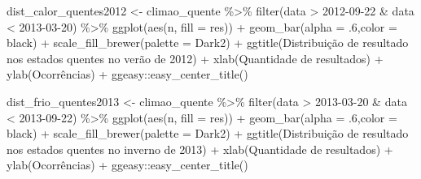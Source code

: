 \documentclass[
]{article}
\newenvironment{Shaded}{\begin{snugshade}}{\end{snugshade}}
\newcommand{\AttributeTok}[1]{\textcolor[rgb]{0.77,0.63,0.00}{#1}}
\newcommand{\DecValTok}[1]{\textcolor[rgb]{0.00,0.00,0.81}{#1}}
\newcommand{\FunctionTok}[1]{\textcolor[rgb]{0.00,0.00,0.00}{#1}}
\newcommand{\NormalTok}[1]{#1}
\newcommand{\OtherTok}[1]{\textcolor[rgb]{0.56,0.35,0.01}{#1}}
\newcommand{\SpecialCharTok}[1]{\textcolor[rgb]{0.00,0.00,0.00}{#1}}
\newcommand{\StringTok}[1]{\textcolor[rgb]{0.31,0.60,0.02}{#1}}
\begin{document}
\begin{Shaded}
\begin{Highlighting}[]
\NormalTok{dist\_calor\_quentes2012 }\OtherTok{\textless{}{-}}\NormalTok{ climao\_quente }\SpecialCharTok{\%\textgreater{}\%} 
  \FunctionTok{filter}\NormalTok{(data }\SpecialCharTok{\textgreater{}} \StringTok{\textquotesingle{}2012{-}09{-}22\textquotesingle{}} \SpecialCharTok{\&}\NormalTok{ data }\SpecialCharTok{\textless{}} \StringTok{\textquotesingle{}2013{-}03{-}20\textquotesingle{}}\NormalTok{) }\SpecialCharTok{\%\textgreater{}\%}
  \FunctionTok{ggplot}\NormalTok{(}\FunctionTok{aes}\NormalTok{(n, }\AttributeTok{fill =}\NormalTok{ res)) }\SpecialCharTok{+} 
  \FunctionTok{geom\_bar}\NormalTok{(}\AttributeTok{alpha =}\NormalTok{ .}\DecValTok{6}\NormalTok{,}\AttributeTok{color =} \StringTok{\textquotesingle{}black\textquotesingle{}}\NormalTok{) }\SpecialCharTok{+} 
  \FunctionTok{scale\_fill\_brewer}\NormalTok{(}\AttributeTok{palette =} \StringTok{\textquotesingle{}Dark2\textquotesingle{}}\NormalTok{) }\SpecialCharTok{+}
  \FunctionTok{ggtitle}\NormalTok{(}\StringTok{\textquotesingle{}Distribuição de resultado nos estados quentes no verão de 2012\textquotesingle{}}\NormalTok{) }\SpecialCharTok{+}
  \FunctionTok{xlab}\NormalTok{(}\StringTok{\textquotesingle{}Quantidade de resultados\textquotesingle{}}\NormalTok{) }\SpecialCharTok{+} \FunctionTok{ylab}\NormalTok{(}\StringTok{\textquotesingle{}Ocorrências\textquotesingle{}}\NormalTok{) }\SpecialCharTok{+}
\NormalTok{  ggeasy}\SpecialCharTok{::}\FunctionTok{easy\_center\_title}\NormalTok{()}


\NormalTok{dist\_frio\_quentes2013 }\OtherTok{\textless{}{-}}\NormalTok{ climao\_quente }\SpecialCharTok{\%\textgreater{}\%} 
  \FunctionTok{filter}\NormalTok{(data }\SpecialCharTok{\textgreater{}} \StringTok{\textquotesingle{}2013{-}03{-}20\textquotesingle{}} \SpecialCharTok{\&}\NormalTok{ data }\SpecialCharTok{\textless{}} \StringTok{\textquotesingle{}2013{-}09{-}22\textquotesingle{}}\NormalTok{) }\SpecialCharTok{\%\textgreater{}\%}
  \FunctionTok{ggplot}\NormalTok{(}\FunctionTok{aes}\NormalTok{(n, }\AttributeTok{fill =}\NormalTok{ res)) }\SpecialCharTok{+} 
  \FunctionTok{geom\_bar}\NormalTok{(}\AttributeTok{alpha =}\NormalTok{ .}\DecValTok{6}\NormalTok{,}\AttributeTok{color =} \StringTok{\textquotesingle{}black\textquotesingle{}}\NormalTok{) }\SpecialCharTok{+} 
  \FunctionTok{scale\_fill\_brewer}\NormalTok{(}\AttributeTok{palette =} \StringTok{\textquotesingle{}Dark2\textquotesingle{}}\NormalTok{) }\SpecialCharTok{+}
  \FunctionTok{ggtitle}\NormalTok{(}\StringTok{\textquotesingle{}Distribuição de resultado nos estados quentes no inverno de 2013\textquotesingle{}}\NormalTok{) }\SpecialCharTok{+}
  \FunctionTok{xlab}\NormalTok{(}\StringTok{\textquotesingle{}Quantidade de resultados\textquotesingle{}}\NormalTok{) }\SpecialCharTok{+} \FunctionTok{ylab}\NormalTok{(}\StringTok{\textquotesingle{}Ocorrências\textquotesingle{}}\NormalTok{) }\SpecialCharTok{+}
\NormalTok{  ggeasy}\SpecialCharTok{::}\FunctionTok{easy\_center\_title}\NormalTok{()}


\end{Highlighting}
\end{Shaded}
\end{document}
